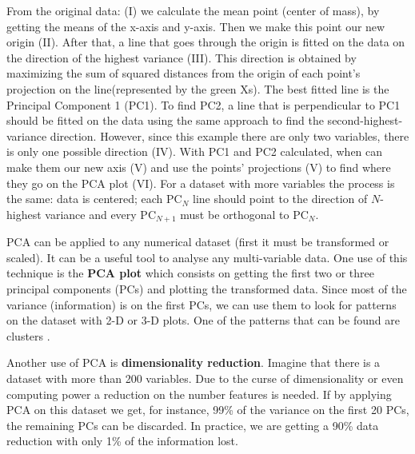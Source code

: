 From the original data: (I) we calculate the mean point (center of mass), by getting the means of the x-axis and y-axis. Then we make this point our new origin (II). After that, a line that goes through the origin is fitted on the data on the direction of the highest variance (III). This direction is obtained by maximizing the sum of squared distances from the origin of each point's projection on the line(represented by the green Xs). The best fitted line is the Principal Component 1 (PC1). To find PC2, a line that is perpendicular to PC1 should be fitted on the data using the same approach to find the second-highest-variance direction. However, since this example there are only two variables, there is only one possible direction (IV). With PC1 and PC2 calculated, when can make them our new axis (V) and use the points' projections (V) to find where they go on the PCA plot (VI). For a dataset with more variables the process is the same: data is centered; each PC$_{N}$ line should point to the direction of $N$-highest variance and every PC$_{N+1}$ must be orthogonal to PC$_{N}$.

PCA can be applied to any numerical dataset \cite{wold1987principal} (first it must be transformed or scaled). It can be a useful tool to analyse any multi-variable data. One use of this technique is the \textbf{PCA plot} which consists on getting the first two or three principal components (PCs) and plotting the transformed data. Since most of the variance (information) is on the first PCs, we can use them to look for patterns on the dataset with 2-D or 3-D plots. One of the patterns that can be found are clusters \cite{ding2004k}. 

Another use of PCA is \textbf{dimensionality reduction}. Imagine that there is a dataset with more than 200 variables. Due to the curse of dimensionality \cite{Bellman:2010:DP:1893145} or even computing power a reduction on the number features is needed. If by applying PCA on this dataset we get, for instance, 99\% of the variance on the first 20 PCs, the remaining PCs can be discarded. In practice, we are getting a 90\% data reduction with only 1\% of the information lost.





